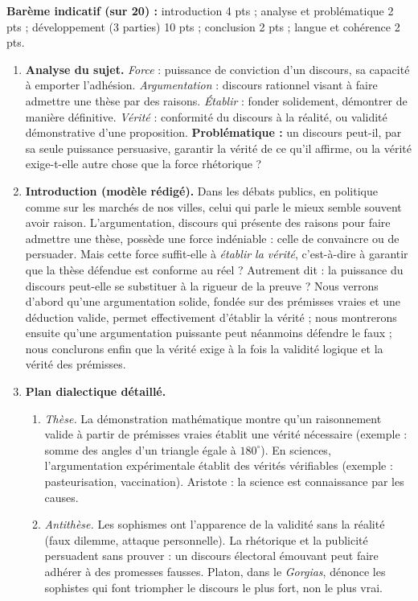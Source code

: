 \documentclass[11pt]{article}
\begin{document}
\begin{corrige}
\textbf{Barème indicatif (sur 20) :} introduction 4 pts ; analyse et problématique 2 pts ; développement (3 parties) 10 pts ; conclusion 2 pts ; langue et cohérence 2 pts.

\begin{enumerate}
\item \textbf{Analyse du sujet.} \emph{Force} : puissance de conviction d'un discours, sa capacité à emporter l'adhésion. \emph{Argumentation} : discours rationnel visant à faire admettre une thèse par des raisons. \emph{Établir} : fonder solidement, démontrer de manière définitive. \emph{Vérité} : conformité du discours à la réalité, ou validité démonstrative d'une proposition. \textbf{Problématique :} un discours peut-il, par sa seule puissance persuasive, garantir la vérité de ce qu'il affirme, ou la vérité exige-t-elle autre chose que la force rhétorique ?
\item \textbf{Introduction (modèle rédigé).} Dans les débats publics, en politique comme sur les marchés de nos villes, celui qui parle le mieux semble souvent avoir raison. L'argumentation, discours qui présente des raisons pour faire admettre une thèse, possède une force indéniable : celle de convaincre ou de persuader. Mais cette force suffit-elle à \emph{établir la vérité}, c'est-à-dire à garantir que la thèse défendue est conforme au réel ? Autrement dit : la puissance du discours peut-elle se substituer à la rigueur de la preuve ? Nous verrons d'abord qu'une argumentation solide, fondée sur des prémisses vraies et une déduction valide, permet effectivement d'établir la vérité ; nous montrerons ensuite qu'une argumentation puissante peut néanmoins défendre le faux ; nous conclurons enfin que la vérité exige à la fois la validité logique et la vérité des prémisses.
\item \textbf{Plan dialectique détaillé.}
\begin{enumerate}
\item \emph{Thèse.} La démonstration mathématique montre qu'un raisonnement valide à partir de prémisses vraies établit une vérité nécessaire (exemple : somme des angles d'un triangle égale à $180^{\circ}$). En sciences, l'argumentation expérimentale établit des vérités vérifiables (exemple : pasteurisation, vaccination). Aristote : la science est connaissance par les causes.
\item \emph{Antithèse.} Les sophismes ont l'apparence de la validité sans la réalité (faux dilemme, attaque personnelle). La rhétorique et la publicité persuadent sans prouver : un discours électoral émouvant peut faire adhérer à des promesses fausses. Platon, dans le \emph{Gorgias}, dénonce les sophistes qui font triompher le discours le plus fort, non le plus vrai.

\end{enumerate}
\end{enumerate}
\end{corrige}
\end{document}
